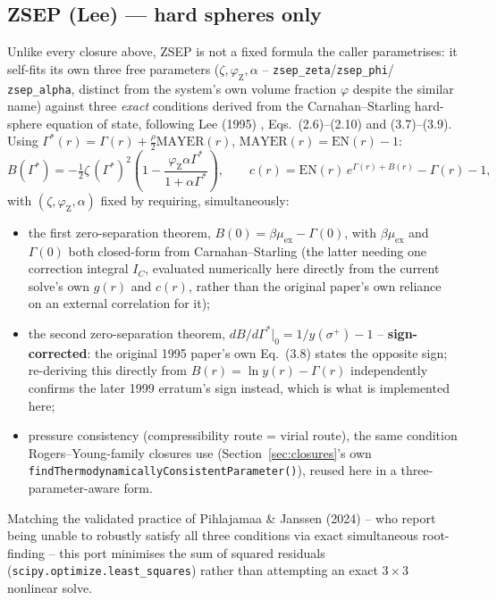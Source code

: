 \documentclass[11pt,a4paper]{article}
\newcommand{\code}[1]{\texttt{#1}}
\begin{document}
\subsection{ZSEP (Lee) \cite{lee1995,lee1999} --- hard spheres only}
\label{sec:zsep}
Unlike every closure above, ZSEP is not a fixed formula the caller
parametrises: it self-fits its own three free parameters
($\zeta,\varphi_{\mathrm{Z}},\alpha$ -- \code{zsep\_zeta}/\code{zsep\_phi}/
\code{zsep\_alpha}, distinct from the system's own volume fraction $\varphi$
despite the similar name) against three \emph{exact} conditions derived from
the Carnahan--Starling hard-sphere equation of state, following Lee (1995)
\cite{lee1995}, Eqs.~(2.6)--(2.10) and (3.7)--(3.9). Using
$\Gamma^*(r)=\Gamma(r)+\tfrac{\rho}{2}\mathrm{MAYER}(r)$,
$\mathrm{MAYER}(r)=\mathrm{EN}(r)-1$:
\begin{equation}
  B(\Gamma^*) = -\tfrac12\zeta\,(\Gamma^*)^2\left(1-\frac{\varphi_{\mathrm{Z}}\alpha\Gamma^*}{1+\alpha\Gamma^*}\right),
  \qquad
  c(r) = \mathrm{EN}(r)\,e^{\Gamma(r)+B(r)} - \Gamma(r) - 1,
\end{equation}
with $(\zeta,\varphi_{\mathrm{Z}},\alpha)$ fixed by requiring, simultaneously:
\begin{itemize}[nosep]
  \item[(A)] the first zero-separation theorem, $B(0)=\beta\mu_{\mathrm{ex}}-\Gamma(0)$,
    with $\beta\mu_{\mathrm{ex}}$ and $\Gamma(0)$ both closed-form from
    Carnahan--Starling (the latter needing one correction integral $I_C$,
    evaluated numerically here directly from the current solve's own $g(r)$
    and $c(r)$, rather than the original paper's own reliance on an external
    correlation for it);
  \item[(B)] the second zero-separation theorem,
    $dB/d\Gamma^*|_0 = 1/y(\sigma^+)-1$ -- \textbf{sign-corrected}: the
    original 1995 paper's own Eq.~(3.8) states the opposite sign; re-deriving
    this directly from $B(r)=\ln y(r)-\Gamma(r)$ independently confirms the
    later 1999 erratum's \cite{lee1999} sign instead, which is what is
    implemented here;
  \item[(C)] pressure consistency (compressibility route = virial route),
    the same condition Rogers--Young-family closures use
    (Section~\ref{sec:closures}'s own \code{findThermodynamicallyConsistentParameter()}),
    reused here in a three-parameter-aware form.
\end{itemize}
Matching the validated practice of Pihlajamaa \& Janssen (2024)
\cite{PihlajamaaJanssen2024} -- who report being unable to robustly satisfy all
three conditions via exact simultaneous root-finding -- this port minimises
the sum of squared residuals (\code{scipy.optimize.least\_squares}) rather
than attempting an exact $3\times3$ nonlinear solve.
\end{document}
